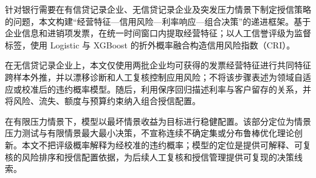 针对银行需要在有信贷记录企业、无信贷记录企业及突发压力情景下制定授信策略的问题，本文构建“经营特征—信用风险—利率响应—组合决策”的递进框架。基于企业信息和进销项发票，在统一时间窗口内提取经营特征；以人工信誉评级为监督标签，使用 Logistic 与 XGBoost 的折外概率融合构造信用风险指数（CRI）。

在无信贷记录企业上，本文仅使用两批企业均可获得的发票经营特征进行共同特征跨样本外推，并以漂移诊断和人工复核控制应用风险；不将该步骤表述为领域自适应或校准后的违约概率模型。随后，利用保序回归描述利率与客户留存的关系，并将风险、流失、额度与预算约束纳入组合授信配置。

在有限压力情景下，模型以最坏情景收益为目标进行稳健配置。该部分定位为情景压力测试与有限情景最大最小决策，不宣称连续不确定集或分布鲁棒优化理论创新。本文不把评级概率解释为经校准的违约概率；模型的定位是提供可解释、可复核的风险排序和授信配置依据，为后续人工复核和授信管理提供可复现的决策线索。

